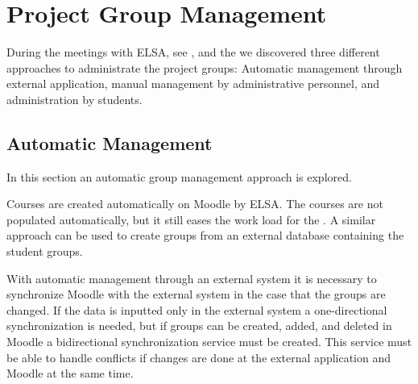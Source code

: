 \section{Project Group Management}
\label{sec:groupManagement}
\label{sec:projectgroupadministration}
During the meetings with ELSA,  see , and the \admpers{} we discovered three different approaches to administrate the project groups: Automatic management through external application, manual management by administrative personnel, and administration by students. 

\subsection{Automatic Management}
\label{sub:automanagement}
In this section an automatic group management approach is explored.  

Courses are created automatically on Moodle by ELSA.
The courses are not populated automatically, but it still eases the work load for the \admpers{}.  
A similar approach can be used to create groups from an external database containing the student groups. 

With automatic management through an external system it is necessary to synchronize Moodle with the external system in the case that the groups are changed. 
If the data is inputted only in the external system a one-directional synchronization is needed, but if groups can be created, added, and deleted in Moodle a bidirectional synchronization service must be created. 
This service must be able to handle conflicts if changes are done at the external application and Moodle at the same time.

